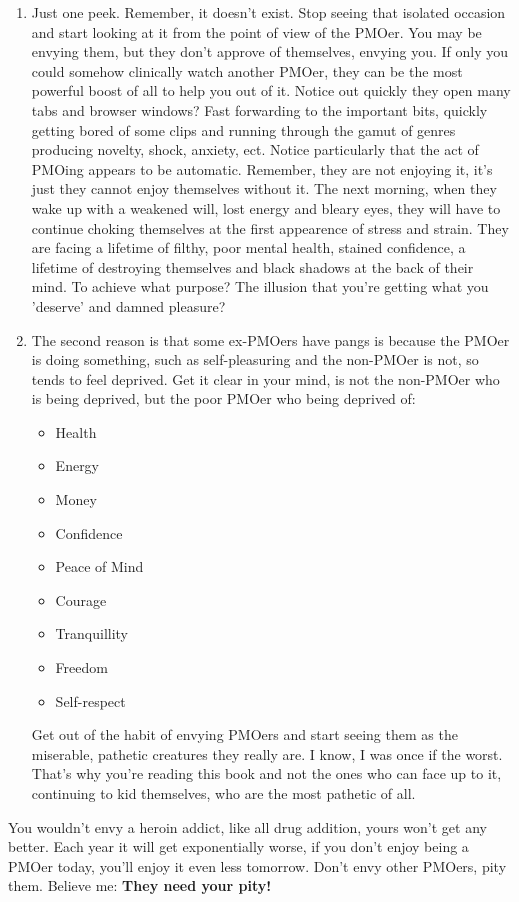 \documentclass[easypeasy.tex]{subfiles}
\begin{document}
\begin{enumerate}
  \item Just one peek. Remember, it doesn't exist. Stop seeing that isolated occasion and start looking at it from the point of view of the PMOer. You may be envying them, but they don't approve of themselves, envying you. If only you could somehow clinically watch another PMOer, they can be the most powerful boost of all to help you out of it. Notice out quickly they open many tabs and browser windows? Fast forwarding to the important bits, quickly getting bored of some clips and running through the gamut of genres producing novelty, shock, anxiety, ect. Notice particularly that the act of PMOing appears to be automatic. Remember, they are not enjoying it, it's just they cannot enjoy themselves without it. The next morning, when they wake up with a weakened will, lost energy and bleary eyes, they will have to continue choking themselves at the first appearence of stress and strain. They are facing a lifetime of filthy, poor mental health, stained confidence, a lifetime of destroying themselves and black shadows at the back of their mind. To achieve what purpose? The illusion that you're getting what you 'deserve' and damned pleasure?

  \item The second reason is that some ex-PMOers have pangs is because the PMOer is doing something, such as self-pleasuring and the non-PMOer is not, so tends to feel deprived. Get it clear in your mind, is not the non-PMOer who is being deprived, but the poor PMOer who being deprived of:
  \begin{itemize}
    \item Health
    \item Energy
    \item Money
    \item Confidence
    \item Peace of Mind
    \item Courage
    \item Tranquillity
    \item Freedom
    \item Self-respect
  \end{itemize}

  Get out of the habit of envying PMOers and start seeing them as the miserable, pathetic creatures they really are. I know, I was once if the worst. That's why you're reading this book and not the ones who can face up to it, continuing to kid themselves, who are the most pathetic of all.
\end{enumerate}

  You wouldn't envy a heroin addict, like all drug addition, yours won't get any better. Each year it will get exponentially worse, if you don't enjoy being a PMOer today, you'll enjoy it even less tomorrow. Don't envy other PMOers, pity them. Believe me: \textbf{They need your pity!}
\end{document}
